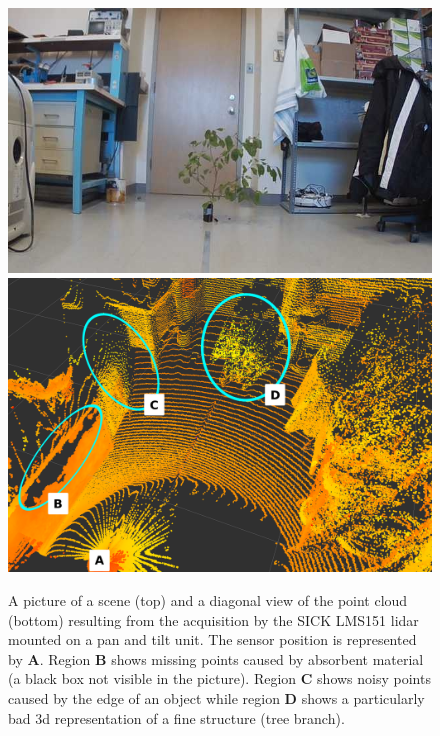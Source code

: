 \begin{figure}[htpb]
    \centering
    \includegraphics[width=0.9\linewidth]{img/chap_lidar/shadow_image.jpg}\\\vspace{1em}
    \includegraphics[width=0.9\linewidth]{img/chap_lidar/shadow_pointcloud.png}
    \caption{A picture of a scene (top) and a diagonal view of the point cloud (bottom) resulting from the acquisition by the SICK LMS151 \gls{lidar} mounted on a pan and tilt unit. The sensor position is represented by \textbf{A}. Region \textbf{B} shows missing points caused by absorbent material (a black box not visible in the picture). Region \textbf{C} shows noisy points caused by the edge of an object while region \textbf{D} shows a particularly bad \gls{3d} representation of a fine structure (tree branch).}
    \label{fig:shadow_points}
\end{figure}
